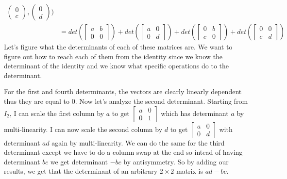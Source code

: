 \begin{example}
\begin{align*}
\begin{pmatrix}
        0 \\ c
    \end{pmatrix}, \begin{pmatrix}
        0 \\ d
    \end{pmatrix})\tag{by Multilinearity}\\
    &=det(\begin{bmatrix}
        a & b \\
        0 & 0
    \end{bmatrix})+det(\begin{bmatrix}
        a & 0 \\
        0 & d
    \end{bmatrix})+det(\begin{bmatrix}
        0 & b \\
        c & 0
    \end{bmatrix})+det(\begin{bmatrix}
        0 & 0 \\
        c & d
    \end{bmatrix})
    \end{align*}
    Let's figure what the determinants of each of these matrices are. We want to figure out how to reach each of them from the identity since we know the determinant of the identity and we know what specific operations do to the determinant. 

    For the first and fourth determinants, the vectors are clearly linearly dependent thus they are equal to $0$. Now let's analyze the second determinant. Starting from $I_2$, I can scale the first column by $a$ to get $\begin{bmatrix}
        a & 0 \\ 0 & 1
    \end{bmatrix}$ which has determinant $a$ by multi-linearity. I can now scale the second column by $d$ to get $\begin{bmatrix}
        a & 0 \\ 0 & d
    \end{bmatrix}$ with determinant $ad$ again by multi-linearity. We can do the same for the third determinant except we have to do a column swap at the end so intead of having determinant $bc$ we get determinant $-bc$ by antisymmetry. So by adding our results, we get that the determinant of an arbitrary $2\times 2$ matrix is $ad-bc$.
\end{example}
